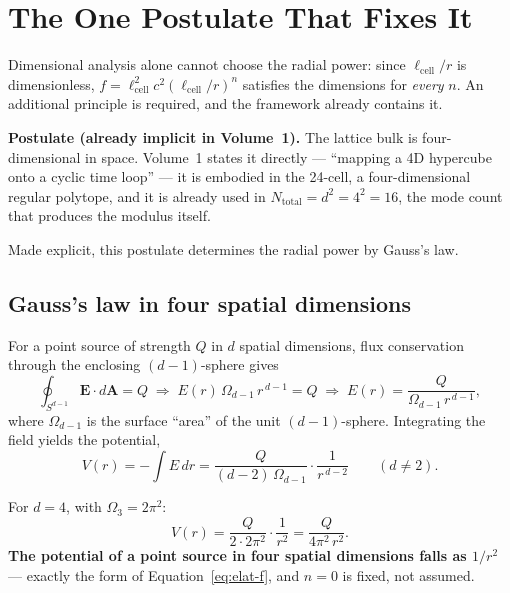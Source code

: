 \documentclass[11pt, letterpaper, openany]{book}
\begin{document}
\section{The One Postulate That Fixes It}

Dimensional analysis alone cannot choose the radial power: since $\ell_{\mathrm{cell}}/r$ is
dimensionless, $f = \ell_{\mathrm{cell}}^2 c^2 (\ell_{\mathrm{cell}}/r)^{n}$ satisfies the dimensions
for \emph{every} $n$. An additional principle is required, and the framework already contains it.

\begin{signalbox}
\textbf{Postulate (already implicit in Volume~1).} The lattice bulk is four-dimensional in space.
Volume~1 states it directly --- ``mapping a 4D hypercube onto a cyclic time loop'' --- it is embodied
in the 24-cell, a four-dimensional regular polytope, and it is already used in
$N_{\mathrm{total}} = d^2 = 4^2 = 16$, the mode count that produces the modulus itself.
\end{signalbox}

Made explicit, this postulate determines the radial power by Gauss's law.

\subsection{Gauss's law in four spatial dimensions}

\begin{derivbox}
For a point source of strength $Q$ in $d$ spatial dimensions, flux conservation through the
enclosing $(d{-}1)$-sphere gives
\[
\oint_{S^{d-1}} \mathbf{E}\cdot d\mathbf{A} = Q
\;\Longrightarrow\;
E(r)\,\Omega_{d-1}\, r^{\,d-1} = Q
\;\Longrightarrow\;
E(r) = \frac{Q}{\Omega_{d-1}\, r^{\,d-1}},
\]
where $\Omega_{d-1}$ is the surface ``area'' of the unit $(d{-}1)$-sphere. Integrating the field
yields the potential,
\begin{equation}
V(r) = -\!\int E\, dr = \frac{Q}{(d-2)\,\Omega_{d-1}}\cdot\frac{1}{r^{\,d-2}} \qquad (d \neq 2).
\label{eq:gauss-d}
\end{equation}

\medskip
For $d = 4$, with $\Omega_3 = 2\pi^2$:
\[
V(r) = \frac{Q}{2\cdot 2\pi^2}\cdot\frac{1}{r^2} = \frac{Q}{4\pi^2\, r^2}.
\]
\textbf{The potential of a point source in four spatial dimensions falls as $1/r^2$} --- exactly the
form of Equation~\ref{eq:elat-f}, and $n = 0$ is fixed, not assumed.
\end{derivbox}
\end{document}
